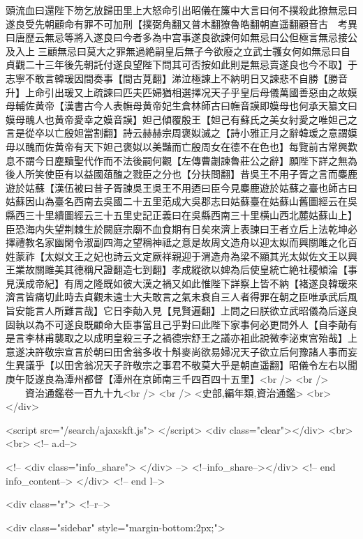 頭流血曰還陛下笏乞放歸田里上大怒命引出昭儀在簾中大言曰何不撲殺此獠無忌曰遂良受先朝顧命有罪不可加刑【撲弼角翻又普木翻獠魯皓翻朝直遥翻顧音古　考異曰唐歷云無忌等將入遂良曰今者多為中宫事遂良欲諫何如無忌曰公但極言無忌接公及入上三顧無忌曰莫大之罪無過絶嗣皇后無子今欲廢之立武士彠女何如無忌曰自貞觀二十三年後先朝託付遂良望陛下問其可否按如此則是無忌賣遂良也今不取】于志寧不敢言韓瑗因間奏事【間古莧翻】涕泣極諫上不納明日又諫悲不自勝【勝音升】上命引出瑗又上疏諫曰匹夫匹婦猶相選擇况天子乎皇后母儀萬國善惡由之故嫫母輔佐黄帝【漢書古今人表幠母黄帝妃生倉林師古曰幠音謨即嫫母也何承天纂文曰嫫母醜人也黄帝愛幸之嫫音謨】妲己傾覆殷王【妲己有蘇氏之美女紂愛之唯妲己之言是從卒以亡殷妲當割翻】詩云赫赫宗周褒姒滅之【詩小雅正月之辭韓瑗之意謂嫫毋以醜而佐黄帝有天下妲己褒姒以美豔而亡殷周女在德不在色也】每覽前古常興歎息不謂今日塵黷聖代作而不法後嗣何觀【左傳曹劌諫魯莊公之辭】願陛下詳之無為後人所笑使臣有以益國葅醢之戮臣之分也【分扶問翻】昔吳王不用子胥之言而麋鹿遊於姑蘇【漢伍被曰昔子胥諫吳王吳王不用迺曰臣今見麋鹿遊於姑蘇之臺也師古曰姑蘇因山為臺名西南去吳國二十五里范成大吳郡志曰姑蘇臺在姑蘇山舊圖經云在吳縣西三十里續圖經云三十五里史記正義曰在吳縣西南三十里横山西北麓姑蘇山上】臣恐海内失望荆棘生於闕庭宗廟不血食期有日矣來濟上表諫曰王者立后上法乾坤必擇禮教名家幽閑令淑副四海之望稱神祗之意是故周文造舟以迎太姒而興關雎之化百姓蒙祚【太姒文王之妃也詩云文定厥祥親迎于渭造舟為梁不顯其光太姒佐文王以興王業故關雎美其德稱尺證翻造七到翻】孝成縱欲以婢為后使皇統亡絶社稷傾淪【事見漢成帝紀】有周之隆既如彼大漢之禍又如此惟陛下詳察上皆不納【褚遂良韓瑗來濟言皆痛切此時去貞觀未遠士大夫敢言之氣未衰自三人者得罪在朝之臣唯承武后風旨安能言人所難言哉】它日李勣入見【見賢遍翻】上問之曰朕欲立武昭儀為后遂良固執以為不可遂良既顧命大臣事當且己乎對曰此陛下家事何必更問外人【自李勣有是言李林甫襲取之以成明皇殺三子之禍德宗舒王之議亦袓此說微李泌東宫殆哉】上意遂决許敬宗宣言於朝曰田舍翁多收十斛麥尚欲易婦况天子欲立后何豫諸人事而妄生異議乎【以田舍翁况天子許敬宗之事君不敬莫大乎是朝直遥翻】昭儀令左右以聞庚午貶遂良為潭州都督【潭州在京師南三千四百四十五里】<br />
<br />
　　資治通鑑卷一百九十九<br />
<br />
<史部,編年類,資治通鑑>  <br>
   </div> 

<script src="/search/ajaxskft.js"> </script>
 <div class="clear"></div>
<br>
<br>
 <!-- a.d-->

 <!--
<div class="info_share">
</div> 
-->
 <!--info_share--></div>   <!-- end info_content-->
  </div> <!-- end l-->

<div class="r">   <!--r-->



<div class="sidebar"  style="margin-bottom:2px;">

